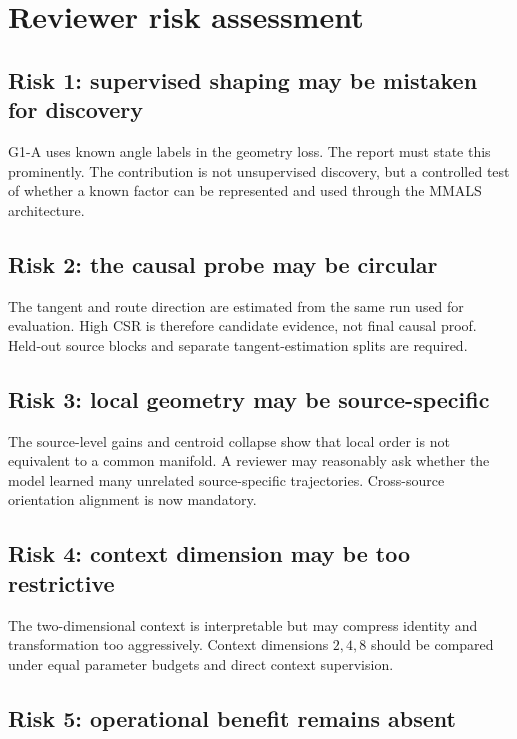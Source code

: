 \documentclass[11pt,a4paper]{article}
\begin{document}
\section{Reviewer risk assessment}

\subsection{Risk 1: supervised shaping may be mistaken for discovery}

G1-A uses known angle labels in the geometry loss. The report must state this prominently. The contribution is not unsupervised discovery, but a controlled test of whether a known factor can be represented and used through the MMALS architecture.

\subsection{Risk 2: the causal probe may be circular}

The tangent and route direction are estimated from the same run used for evaluation. High CSR is therefore candidate evidence, not final causal proof. Held-out source blocks and separate tangent-estimation splits are required.

\subsection{Risk 3: local geometry may be source-specific}

The source-level gains and centroid collapse show that local order is not equivalent to a common manifold. A reviewer may reasonably ask whether the model learned many unrelated source-specific trajectories. Cross-source orientation alignment is now mandatory.

\subsection{Risk 4: context dimension may be too restrictive}

The two-dimensional context is interpretable but may compress identity and transformation too aggressively. Context dimensions $2,4,8$ should be compared under equal parameter budgets and direct context supervision.

\subsection{Risk 5: operational benefit remains absent}
\end{document}

